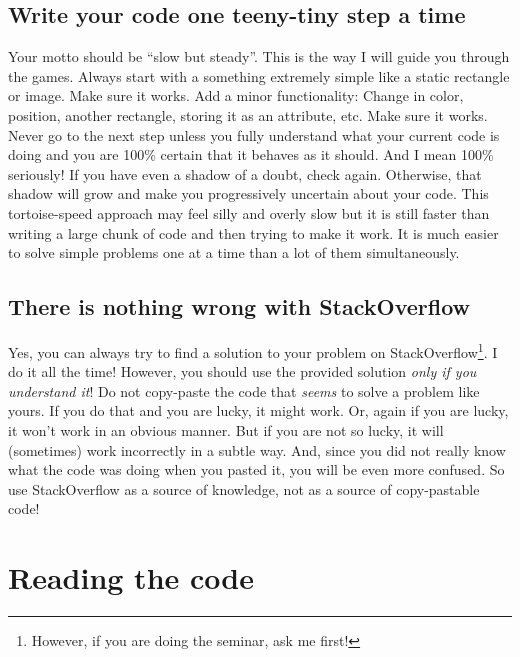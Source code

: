 \documentclass[
]{book}
\begin{document}
\hypertarget{write-your-code-one-teeny-tiny-step-a-time}{%
\subsection{Write your code one teeny-tiny step a time}\label{write-your-code-one-teeny-tiny-step-a-time}}

Your motto should be ``slow but steady''. This is the way I will guide you through the games. Always start with a something extremely simple like a static rectangle or image. Make sure it works. Add a minor functionality: Change in color, position, another rectangle, storing it as an attribute, etc. Make sure it works. Never go to the next step unless you fully understand what your current code is doing and you are 100\% certain that it behaves as it should. And I mean 100\% seriously! If you have even a shadow of a doubt, check again. Otherwise, that shadow will grow and make you progressively uncertain about your code. This tortoise-speed approach may feel silly and overly slow but it is still faster than writing a large chunk of code and then trying to make it work. It is much easier to solve simple problems one at a time than a lot of them simultaneously.

\hypertarget{there-is-nothing-wrong-with-stackoverflow}{%
\subsection{There is nothing wrong with StackOverflow}\label{there-is-nothing-wrong-with-stackoverflow}}

Yes, you can always try to find a solution to your problem on StackOverflow\footnote{However, if you are doing the seminar, ask me first!}. I do it all the time! However, you should use the provided solution \emph{only if you understand it}! Do not copy-paste the code that \emph{seems} to solve a problem like yours. If you do that and you are lucky, it might work. Or, again if you are lucky, it won't work in an obvious manner. But if you are not so lucky, it will (sometimes) work incorrectly in a subtle way. And, since you did not really know what the code was doing when you pasted it, you will be even more confused. So use StackOverflow as a source of knowledge, not as a source of copy-pastable code!

\hypertarget{reading-tips}{%
\section{Reading the code}\label{reading-tips}}
\end{document}
